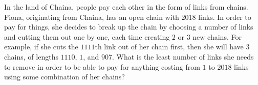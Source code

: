 In the land of Chaina, people pay each other in the form of links from chains. Fiona, originating from Chaina, has an open chain with $2018$ links. In order to pay for things, she decides to break up the chain by choosing a number of links and cutting them out one by one, each time creating $2$ or $3$ new chains. For example, if she cuts the $1111$th link out of her chain first, then she will have $3$ chains, of lengths $1110$, $1$, and $907$. What is the least number of links she needs to remove in order to be able to pay for anything costing from $1$ to $2018$ links using some combination of her chains?